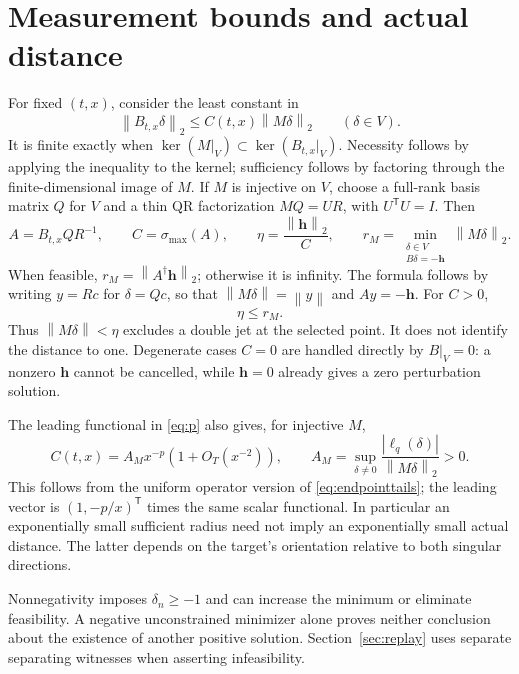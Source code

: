 \documentclass[11pt]{article}
\theoremstyle{remark}\newtheorem{remark}[theorem]{Remark}
\newcommand{\norm}[1]{\left\lVert #1\right\rVert}
\newcommand{\jet}{\mathbf h}
\begin{document}
\section{Measurement bounds and actual distance}\label{sec:measurement}
For fixed $(t,x)$, consider the least constant in
\begin{equation}\label{eq:C}
 \norm{B_{t,x}\delta}_2\le C(t,x)\norm{M\delta}_2\qquad(\delta\in V).
\end{equation}
It is finite exactly when $\ker(M|_V)\subset\ker(B_{t,x}|_V)$. Necessity follows by applying the inequality to the kernel; sufficiency follows by factoring through the finite-dimensional image of $M$. If $M$ is injective on $V$, choose a full-rank basis matrix $Q$ for $V$ and a thin QR factorization $MQ=UR$, with $U^{\mathsf T}U=I$. Then
\begin{equation}\label{eq:distances}
 A=B_{t,x}QR^{-1},\qquad C=\sigma_{\max}(A),\qquad
 \eta=\frac{\norm\jet_2}{C},\qquad
 r_M=\min_{\substack{\delta\in V\\B\delta=-\jet}}\norm{M\delta}_2.
\end{equation}
When feasible, $r_M=\norm{A^\dagger\jet}_2$; otherwise it is infinity. The formula follows by writing $y=R c$ for $\delta=Qc$, so that $\norm{M\delta}=\norm y$ and $Ay=-\jet$. For $C>0$,
\begin{equation}\label{eq:eta}
 \eta\le r_M.
\end{equation}
Thus $\norm{M\delta}<\eta$ excludes a double jet at the selected point. It does not identify the distance to one. Degenerate cases $C=0$ are handled directly by $B|_V=0$: a nonzero $\jet$ cannot be cancelled, while $\jet=0$ already gives a zero perturbation solution.

The leading functional in \eqref{eq:p} also gives, for injective $M$,
\begin{equation}\label{eq:Casymptotic}
 C(t,x)=A_Mx^{-p}(1+O_T(x^{-2})),\qquad
 A_M=\sup_{\delta\ne0}\frac{|\ell_q(\delta)|}{\norm{M\delta}_2}>0.
\end{equation}
This follows from the uniform operator version of \eqref{eq:endpointtails}; the leading vector is $(1,-p/x)^{\mathsf T}$ times the same scalar functional. In particular an exponentially small sufficient radius need not imply an exponentially small actual distance. The latter depends on the target's orientation relative to both singular directions.

Nonnegativity imposes $\delta_n\ge-1$ and can increase the minimum or eliminate feasibility. A negative unconstrained minimizer alone proves neither conclusion about the existence of another positive solution. Section~\ref{sec:replay} uses separate separating witnesses when asserting infeasibility.
\end{document}
